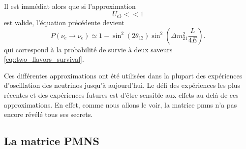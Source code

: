         Il est immédiat alors que si l'approximation 
        \begin{equation}\label{eq::approx_13_eq_0}
          U_{e3} << 1
        \end{equation}
        est valide, l'équation précédente devient
        \begin{equation}\label{eq::solar_oscillation}
          P(\nu_e\to\nu_e) \simeq 1-\sin^2(2\theta_{12})\sin^2\left(\Delta m^2_{21}\frac{L}{4E}\right).
        \end{equation}
        qui correspond à la probabilité de survie à deux saveurs \eqref{eq::two_flavors_survival}.
        
        Ces différentes approximations ont été utilisées dans la plupart des expériences d'oscillation des neutrinos jusqu'à aujourd'hui. Le défi des expériences les plus récentes et des expériences futures est d'être sensible aux effets au delà de ces approximations. En effet, comme nous allons le voir, la matrice \gls{pmns} n'a pas encore révélé tous ses secrets.

    \subsection{La matrice PMNS}\label{sec::pmns}

